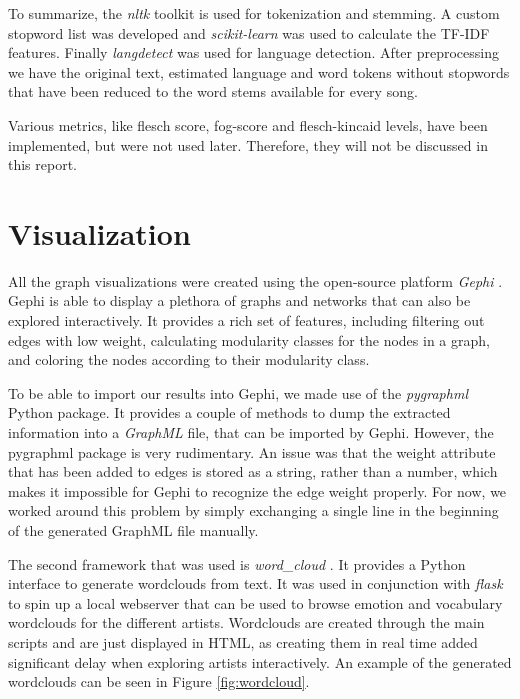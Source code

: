 \documentclass[10pt,a4paper]{article}
\begin{document}
	To summarize, the \textit{nltk} toolkit is used for tokenization and stemming. A custom stopword list was developed and \textit{scikit-learn} was used to calculate the TF-IDF features. Finally \textit{langdetect} was used for language detection. After preprocessing we have the original text, estimated language and word tokens without stopwords that have been reduced to the word stems available for every song.
	
	Various metrics, like flesch score, fog-score and flesch-kincaid levels, have been implemented, but were not used later. Therefore, they will not be discussed in this report.
	
	\section{Visualization}
	\label{sec:visualization}
	
	All the graph visualizations were created using the open-source platform \textit{Gephi} \cite{ICWSM09154}. Gephi is able to display a plethora of graphs and networks that can also be explored interactively. It provides a rich set of features, including filtering out edges with low weight, calculating modularity classes for the nodes in a graph, and coloring the nodes according to their modularity class. 
	
	To be able to import our results into Gephi, we made use of the \textit{pygraphml} Python package. It provides a couple of methods to dump the extracted information into a \textit{GraphML} file, that can be imported by Gephi. However, the pygraphml package is very rudimentary. An issue was that the weight attribute that has been added to edges is stored as a string, rather than a number, which makes it impossible for Gephi to recognize the edge weight properly. For now, we worked around this problem by simply exchanging a single line in the beginning of the generated GraphML file manually.
	
	The second framework that was used is \textit{word\_cloud} \cite{wordcloud}. It provides a Python interface to generate wordclouds from text. It was used in conjunction with \textit{flask} \cite{flask} to spin up a local webserver that can be used to browse emotion and vocabulary wordclouds for the different artists. Wordclouds are created through the main scripts and are just displayed in HTML, as creating them in real time added significant delay when exploring artists interactively. An example of the generated wordclouds can be seen in Figure \ref{fig:wordcloud}.
	
\end{document}
